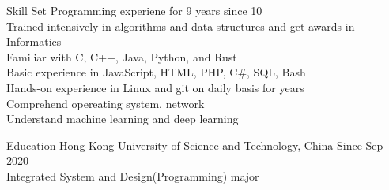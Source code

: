 \documentclass{resume} %
\begin{document}
\begin{rSection}{Skill Set}
    Programming experiene for 9 years since 10\\
    Trained intensively in algorithms and data structures and get awards in Informatics\\
    Familiar with C, C++, Java, Python, and Rust\\
    Basic experience in JavaScript, HTML, PHP, C\#, SQL, Bash\\
    Hands-on experience in Linux and git on daily basis for years\\
    Comprehend opereating system, network\\
    Understand machine learning and deep learning
\end{rSection}

\begin{rSection}{Education}
    Hong Kong University of Science and Technology, China \hfill Since Sep 2020 \\ Integrated System and Design(Programming) major
\end{rSection}
\end{document}
